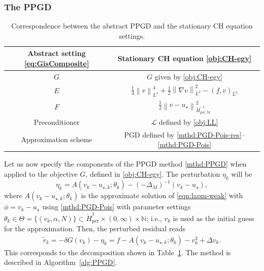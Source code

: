 \documentclass{amsart}
\newcommand{\nrm}[1]{\left\| #1 \right\|}
\newcommand{\polN}{\mathbb N}
\newcommand{\Homz}{{\mathring{H}_{\mathrm{per}}^{1}}}
\newcommand{\HMm}{{\mathring{H}_{\mathrm{per},M}^{-1}}}
\newcommand{\vk}{{v_{k}}}
\newcommand{\etak}{{\eta_{k}}}
\newcommand{\dG}{{\delta G}}
\newcommand{\LL}{\mathcal{L}}
\newcommand{\ins}{{\alpha}} %
\theoremstyle{definition}
\begin{document}
\subsubsection{The PPGD}

\begin{table}[h!]
	\centering
	\begin{tabular}{@{}cc@{}}
		\toprule
		\textbf{Abstract setting \eqref{eq:GisComposite}} & \textbf{Stationary CH equation \eqref{obj:CH-egy}} \\
		\midrule
		$G$                 & $G$ given by \eqref{obj:CH-egy} \\
		$E$                 & $\frac{1}{4}\nrm{v}_{L^4}^4 + \frac{1}{2} \nrm{\nabla v }_{L^2}^2 - (f,v)_{L^2}$ \\
		$F$                 & $\frac{1}{2}\nrm{v - u_\star}_{\HMm}^2$ \\
		Preconditioner      & $\LL$ defined by \eqref{obj:LL} \\
		Approximation scheme & PGD defined by \eqref{mthd:PGD-Pois-res}--\eqref{mthd:PGD-Pois} \\
		\bottomrule
	\end{tabular}
	\caption{Correspondence between the abstract PPGD and the stationary CH equation settings.}
	\label{tab:PPGD-setting}
\end{table}


Let us now specify the components of the PPGD method \eqref{mthd:PPGD} when applied to the objective $G$, defined in \eqref{obj:CH-egy}. The perturbation $\eta_k$ will be
\begin{equation}\label{obj:pert-CH}
\etak=A(\vk - u_{\star,k}; \theta_k)-(-\Delta_M)^{-1}\left(\vk - u_{\star}\right),
	\end{equation}
where $A(\vk - u_{\star,k}; \theta_k)$ is the approximate solution of \eqref{eqn:lapm-weak} with $\phi=\vk-u_\star$ using \eqref{mthd:PGD-Pois} with parameter settings $\theta_k \in \Theta = \{(\vk, \ins,N) \} \subset \Homz \times (0,\infty) \times \polN$; i.e., $\vk$ is used as the initial guess for the approximation. Then, the perturbed residual reads
\begin{align}\label{obj:pert-res}
	\tilde r_{k} = -\dG(v_k)-\eta_{k} = f-A(\vk - u_{\star,k}; \theta_k) - v_k^3 + \Delta v_k.
\end{align}
This corresponds to the decomposition shown in Table~\ref{tab:PPGD-setting}. The method is described in Algorithm~\ref{alg:PPGD}.
\end{document}
